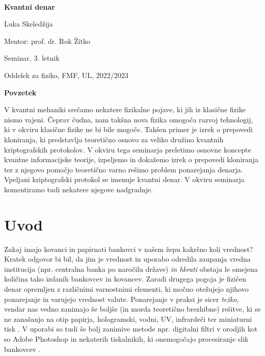 \documentclass[12pt]{article}
\begin{document}
 $~$ 
	
 \vspace{2cm}
 
 \centerline{\bf \huge   Kvantni denar}
 
 \vspace{1cm}
 
  \centerline{\huge  Luka Skeledžija}
  
   \vspace{1cm}
  
  \centerline{\large Mentor: prof. dr. Rok Žitko}
  
  \vspace{1cm}
  
  \centerline{\large Seminar, 3. letnik}
  
  \vspace{1cm}
  
  \centerline{\large Oddelek za fiziko, FMF, UL, 2022/2023}
  
  \vspace{6cm}
  
  \begin{minipage}[c]{0.9\hsize}
  {\bf Povzetek}
  
  V kvantni mehaniki srečamo nekatere fizikalne pojave, ki jih iz klasične fizike nismo vajeni. Čeprav čudna, nam takšna nova fizika omogoča razvoj tehnologij, ki v okviru klasične fizike ne bi bile mogoče. Takšen primer je izrek o prepovedi kloniranja, ki predstavlja teoretično osnovo za veliko družino kvantnih kriptografskih protokolov. V okviru tega seminarja preletimo osnovne koncepte kvantne informacijske teorije, izpeljemo in dokažemo izrek o prepovedi kloniranja ter z njegovo pomočjo teoretično varno rešimo problem ponarejanja denarja. Vpeljani kriptografski protokol se imenuje kvantni denar. V okviru seminarja komentiramo tudi nekatere njegove nadgradnje. 
    \end{minipage}
\pagestyle{empty}
 
 \newpage
   \pagestyle{plain}
\setcounter{page}{1}
 \tableofcontents

 \newpage

  
 \section{Uvod}
	Zakaj imajo kovanci in papirnati bankovci v našem žepu kakršno koli vrednost? Kratek odgovor bi bil, da jim je vrednost in uporabo odredila zaupanja vredna institucija (npr. centralna banka po naročilu države) \emph{in hkrati} obstaja le omejena količina tako izdanih bankovcev in kovancev. Zaradi drugega pogoja je fizičen denar opremljen z različnimi varnostnimi elementi, ki močno otežujejo njihovo ponarejanje in varujejo vrednost valute. Ponarejanje v praksi je sicer \emph{težko}, vendar nas vedno zanimajo še boljše (in morda teoretično brezhibne) rešitve, ki se ne zanašanjo na otip papirja, hologramski, vodni, UV, infrardeči ter miniaturni tisk \cite{bankSecurityFeatures2018}.  V uporabi so tudi še bolj zanimive metode npr. digitalni filtri v orodjih kot so Adobe Photoshop in nekaterih tiskalnikih, ki onemogočajo procesiranje slik bankovcev \cite{SoftwareDetectionCurrency}. 
\end{document}
